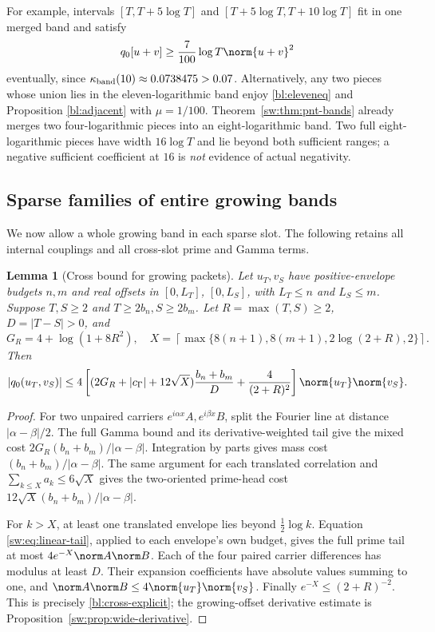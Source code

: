 \documentclass[11pt,a4paper]{article}
\numberwithin{equation}{section}
\newtheorem{lemma}[theorem]{Lemma}
\theoremstyle{definition}\newtheorem{definition}[theorem]{Definition}
\theoremstyle{remark}\newtheorem{remark}[theorem]{Remark}
\begin{document}
For example, intervals $[T,T+5\log T]$ and $[T+5\log T,T+10\log T]$ fit in one merged band and satisfy
\begin{equation}
 q_0[u+v]\ge\frac7{100}\log T\norm{u+v}^2
\end{equation}
eventually, since $\kappa_{\rm band}(10)\approx0.0738475>0.07$. Alternatively, any two pieces whose union lies in the eleven-logarithmic band enjoy \eqref{bl:eleveneq} and Proposition \ref{bl:adjacent} with $\mu=1/100$. Theorem~\ref{sw:thm:pnt-bands} already merges two four-logarithmic pieces into an eight-logarithmic band. Two full eight-logarithmic pieces have width $16\log T$ and lie beyond both sufficient ranges; a negative sufficient coefficient at $16$ is \emph{not} evidence of actual negativity.

\subsection{Sparse families of entire growing bands}\label{bl:sec:sparse}
We now allow a whole growing band in each sparse slot. The following retains all internal couplings and all cross-slot prime and Gamma terms.

\begin{lemma}[Cross bound for growing packets]\label{bl:cross}
Let $u_T,v_S$ have positive-envelope budgets $n,m$ and real offsets in $[0,L_T]$, $[0,L_S]$, with $L_T\le n$ and $L_S\le m$. Suppose $T,S\ge2$ and $T\ge2b_n,S\ge2b_m$. Let $R=\max(T,S)\ge2$, $D=|T-S|>0$, and
\begin{equation}
 G_R=4+\log(1+8R^2),\quad
 X=\left\lceil\max\{8(n+1),8(m+1),2\log(2+R),2\}\right\rceil.
\end{equation}
Then
\begin{equation}\label{bl:cross-explicit}
 |q_0(u_T,v_S)|\le4\left[(2G_R+|c_\Gamma|+12\sqrt X)
 \frac{b_n+b_m}{D}+\frac4{(2+R)^2}\right]\norm{u_T}\norm{v_S}.
\end{equation}
\end{lemma}
\begin{proof}
For two unpaired carriers $e^{i\alpha x}A,e^{i\beta x}B$, split the Fourier line at distance $|\alpha-\beta|/2$. The full Gamma bound and its derivative-weighted tail give the mixed cost $2G_R(b_n+b_m)/|\alpha-\beta|$. Integration by parts gives mass cost $(b_n+b_m)/|\alpha-\beta|$. The same argument for each translated correlation and $\sum_{k\le X}a_k\le6\sqrt X$ gives the two-oriented prime-head cost $12\sqrt X(b_n+b_m)/|\alpha-\beta|$.

For $k>X$, at least one translated envelope lies beyond $\frac12\log k$. Equation \eqref{sw:eq:linear-tail}, applied to each envelope's own budget, gives the full prime tail at most $4e^{-X}\norm A\norm B$. Each of the four paired carrier differences has modulus at least $D$. Their expansion coefficients have absolute values summing to one, and $\norm A\norm B\le4\norm{u_T}\norm{v_S}$. Finally $e^{-X}\le(2+R)^{-2}$. This is precisely \eqref{bl:cross-explicit}; the growing-offset derivative estimate is Proposition~\ref{sw:prop:wide-derivative}.
\end{proof}
\end{document}
